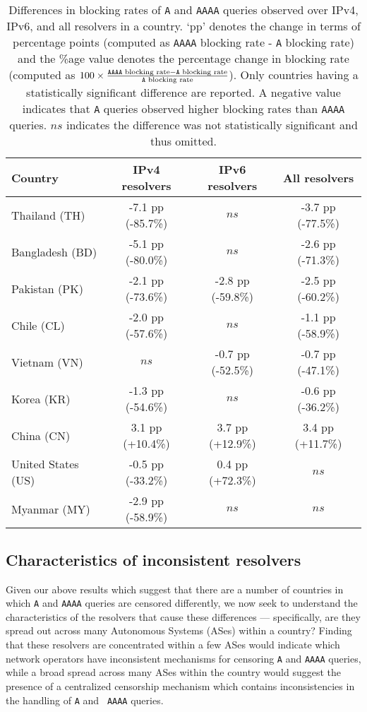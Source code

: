 \begin{table}[t]
  \centering
  \small
  \scalebox{\tabularscale} {
  \begin{tabular}{lccc}%
    \toprule
    {\bf Country}&{\bf IPv4 resolvers}&{\bf IPv6 resolvers} & {\bf All resolvers}
    \\ \midrule
    Thailand (TH)      & -7.1 pp (-85.7\%) & $ns$               & -3.7 pp (-77.5\%) \\
    Bangladesh (BD)    & -5.1 pp (-80.0\%) & $ns$               & -2.6 pp (-71.3\%) \\
    Pakistan (PK)      & -2.1 pp (-73.6\%) & -2.8 pp (-59.8\%)  & -2.5 pp (-60.2\%) \\
    Chile (CL)         & -2.0 pp (-57.6\%) & $ns$               & -1.1 pp (-58.9\%) \\
    Vietnam (VN)       & $ns$              & -0.7 pp (-52.5\%)  & -0.7 pp (-47.1\%) \\
    Korea (KR)         & -1.3 pp (-54.6\%) & $ns$               & -0.6 pp (-36.2\%) \\
    China (CN)         &  3.1 pp (+10.4\%) &  3.7 pp (+12.9\%)  &  3.4 pp (+11.7\%) \\
    \midrule
    United States (US) & -0.5 pp (-33.2\%) &  0.4 pp (+72.3\%)  &  $ns$  \\
    Myanmar (MY)       & -2.9 pp (-58.9\%) & $ns$    &  $ns$  \\
    \bottomrule
  \end{tabular}
  }
  \caption{Differences in blocking rates of {\tt A} and {\tt AAAA} queries
  observed over IPv4, IPv6, and all resolvers in a country. `pp' denotes the
  change in terms of percentage points (computed as {\tt AAAA} blocking rate
  - {\tt A} blocking rate) and the \%age value denotes the percentage change in
  blocking rate (computed as
  $
  100\times\frac{\text{{\tt AAAA} blocking rate} - \text{{\tt A} blocking rate}}
  {\text{{\tt A} blocking rate}}
  $). 
  Only countries having
  a statistically significant difference are reported. A negative value
  indicates that {\tt A} queries observed higher blocking rates than {\tt AAAA}
  queries. $ns$ indicates the difference was not statistically significant and
  thus omitted.}
  \label{tab:resources:countries}
\end{table}

\subsection{Characteristics of inconsistent resolvers}
\label{sec:resources:resolvers}
Given our above results which suggest that there are a number of countries in
which {\tt A} and {\tt AAAA} queries are censored differently, we now seek to
understand the characteristics of the resolvers that cause these differences
--- specifically, are they spread out across many Autonomous Systems (ASes)
within a country? Finding that these resolvers are concentrated within a few
ASes would indicate which network operators have inconsistent mechanisms for
censoring {\tt A} and {\tt AAAA} queries, while a broad spread across many ASes
within the country would suggest the presence of a centralized censorship
mechanism which contains inconsistencies in the handling of {\tt A} and {\tt
AAAA} queries. 


